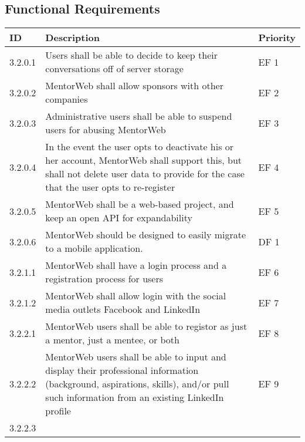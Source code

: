 \documentclass[11pt]{article}
\begin{document}
    \subsection{Functional Requirements}
    \begin{tabular}{|l|p{8 cm}|l|}
        \hline
        ID      & Description                             & Priority \\ \hline
        3.2.0.1 & Users shall be able to decide to keep
                  their conversations\index{Conversation}
                  off of server storage                   & EF 1 \\ \hline
        3.2.0.2 & MentorWeb shall allow
                  sponsors\index{Sponsor} with other
                  companies                               & EF 2 \\ \hline
        3.2.0.3 & Administrative users shall be able to
                  suspend users for abusing
                  MentorWeb\index{MentorWeb}              & EF 3 \\ \hline
        3.2.0.4 & In the event the user opts to deactivate
                  his or her account,
                  MentorWeb\index{MentorWeb} shall
                  support this, but shall not delete user
                  data to provide for the case that the
                  user opts to re-register                & EF 4 \\ \hline
        3.2.0.5 & MentorWeb\index{MentorWeb} shall be a
                  web-based project, and keep an open API
                  for expandability                       & EF 5 \\ \hline
                  3.2.0.6 & MentorWeb\index{MentorWeb}
                  should be designed to easily migrate to
                  a mobile application.                   & DF 1 \\ \hline
        3.2.1.1 & MentorWeb\index{MentorWeb} shall have a
                  login process and a registration process
                  for users                               & EF 6 \\ \hline
        3.2.1.2 & MentorWeb\index{MentorWeb} shall allow
                  login with the social media outlets
                  Facebook\index{Facebook} and
                  LinkedIn\index{LinkedIn}                & EF 7 \\ \hline
        3.2.2.1 & MentorWeb\index{MentorWeb} users shall
                  be able to registor as just a
                  mentor\index{Mentor}, just a
                  mentee\index{Mentee}, or both           & EF 8 \\ \hline
        3.2.2.2 & MentorWeb\index{MentorWeb} users shall
                  be able to input and display their
                  professional information (background,
                  aspirations, skills), and/or pull such
                  information from an existing
                  LinkedIn\index{LinkedIn} profile       & EF 9 \\ \hline
        3.2.2.3
    \end{tabular}
\end{document}
